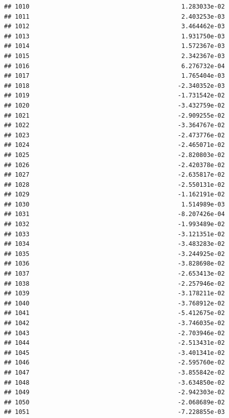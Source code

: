 \documentclass[
]{article}
\begin{document}
\begin{verbatim}
## 1010                                          1.283033e-02
## 1011                                          2.403253e-03
## 1012                                          3.464462e-03
## 1013                                          1.931750e-03
## 1014                                          1.572367e-03
## 1015                                          2.342367e-03
## 1016                                          6.276732e-04
## 1017                                          1.765404e-03
## 1018                                         -2.340352e-03
## 1019                                         -1.731542e-02
## 1020                                         -3.432759e-02
## 1021                                         -2.909255e-02
## 1022                                         -3.364767e-02
## 1023                                         -2.473776e-02
## 1024                                         -2.465071e-02
## 1025                                         -2.820803e-02
## 1026                                         -2.420378e-02
## 1027                                         -2.635817e-02
## 1028                                         -2.550131e-02
## 1029                                         -1.162191e-02
## 1030                                          1.514989e-03
## 1031                                         -8.207426e-04
## 1032                                         -1.993489e-02
## 1033                                         -3.121351e-02
## 1034                                         -3.483283e-02
## 1035                                         -3.244925e-02
## 1036                                         -3.828698e-02
## 1037                                         -2.653413e-02
## 1038                                         -2.257946e-02
## 1039                                         -3.178211e-02
## 1040                                         -3.768912e-02
## 1041                                         -5.412675e-02
## 1042                                         -3.746035e-02
## 1043                                         -2.703946e-02
## 1044                                         -2.513431e-02
## 1045                                         -3.401341e-02
## 1046                                         -2.595760e-02
## 1047                                         -3.855842e-02
## 1048                                         -3.634850e-02
## 1049                                         -2.942303e-02
## 1050                                         -2.068689e-02
## 1051                                         -7.228855e-03

\end{verbatim}
\end{document}
